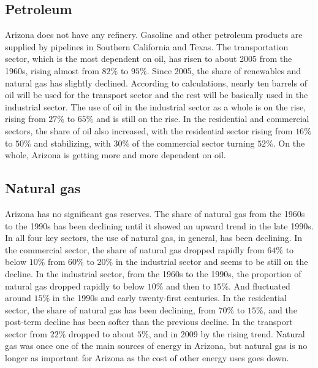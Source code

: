 \documentclass{mcmthesis}
\begin{document}
\subsection{Petroleum}
  Arizona does not have any refinery. Gasoline and other petroleum products are supplied by pipelines in Southern California and Texas.
  The transportation sector, which is the most dependent on oil, has risen to about 2005 from the 1960s, rising almost from $82\%$ to $95\%$.
  Since 2005, the share of renewables and natural gas has slightly declined. According to calculations, nearly ten barrels of oil will be
  used for the transport sector and the rest will be basically used in the industrial sector. The use of oil in the industrial sector
  as a whole is on the rise, rising from $27\%$ to $65\%$ and is still on the rise. In the residential and commercial sectors, the share of
  oil also increased, with the residential sector rising from $16\%$ to $50\%$ and stabilizing, with $30\%$ of the commercial sector turning $52\%$.
  On the whole, Arizona is getting more and more dependent on oil.
\subsection{Natural gas}
  Arizona has no significant gas reserves. The share of natural gas from the 1960s to the 1990s has been declining until it showed an upward
  trend in the late 1990s. In all four key sectors, the use of natural gas, in general, has been declining. In the commercial sector, the
  share of natural gas dropped rapidly from $64\%$ to below $10\%$ from $60\%$ to $20\%$ in the industrial sector and seems to be still on the decline.
  In the industrial sector, from the 1960s to the 1990s, the proportion of natural gas dropped rapidly to below $10\%$ and then to $15\%$.
  And fluctuated around $15\%$ in the 1990s and early twenty-first centuries. In the residential sector, the share of natural gas has been declining,
  from $70\%$ to $15\%$, and the post-term decline has been softer than the previous decline. In the transport sector from
  $22\%$ dropped to about $5\%$, and in 2009 by the rising trend. Natural gas was once one of the main sources of energy in Arizona, but natural
  gas is no longer as important for Arizona as the cost of other energy uses goes down.
\end{document}
